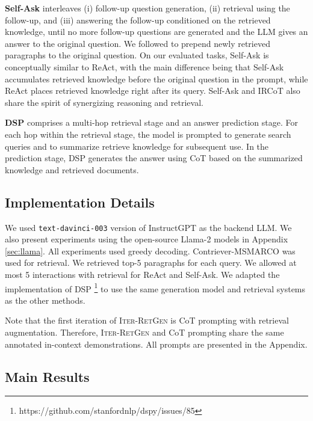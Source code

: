 \documentclass[11pt]{article}
\begin{document}
\noindent
\textbf{Self-Ask} \cite{DBLP:journals/corr/abs-2210-03350} interleaves (i) follow-up question generation, (ii) retrieval using the follow-up, and (iii) answering the follow-up conditioned on the retrieved knowledge, until no more follow-up questions are generated and the LLM gives an answer to the original question.
We followed \cite{DBLP:journals/corr/abs-2304-13007} to prepend newly retrieved paragraphs to the original question.
On our evaluated tasks, Self-Ask is conceptually similar to ReAct, with the main difference being that Self-Ask accumulates retrieved knowledge before the original question in the prompt, while ReAct places retrieved knowledge right after its query.
Self-Ask and IRCoT \cite{DBLP:journals/corr/abs-2212-10509} also share the spirit of synergizing reasoning and retrieval.

\noindent
\textbf{DSP} \cite{DBLP:journals/corr/abs-2212-14024} comprises a multi-hop retrieval stage and an answer prediction stage.
For each hop within the retrieval stage, the model is prompted to generate search queries and to summarize retrieve knowledge for subsequent use.
In the prediction stage, DSP generates the answer using CoT based on the summarized knowledge and retrieved documents.

\subsection{Implementation Details}

We used \texttt{text-davinci-003} version of InstructGPT \cite{DBLP:conf/nips/Ouyang0JAWMZASR22} as the backend LLM.
We also present experiments using the open-source Llama-2 models \cite{DBLP:journals/corr/abs-2307-09288} in Appendix \ref{sec:llama}.
All experiments used greedy decoding.
Contriever-MSMARCO \cite{DBLP:journals/tmlr/IzacardCHRBJG22} was used for retrieval.
We retrieved top-5 paragraphs for each query.
We allowed at most 5 interactions with retrieval for ReAct and Self-Ask.
We adapted the implementation of DSP \footnote{https://github.com/stanfordnlp/dspy/issues/85} to use the same generation model and retrieval systems as the other methods.

Note that the first iteration of I\textsc{ter}-R\textsc{et}G\textsc{en} is CoT prompting with retrieval augmentation.
Therefore, I\textsc{ter}-R\textsc{et}G\textsc{en} and CoT prompting share the same annotated in-context demonstrations.
All prompts are presented in the Appendix.

\subsection{Main Results}
\end{document}
